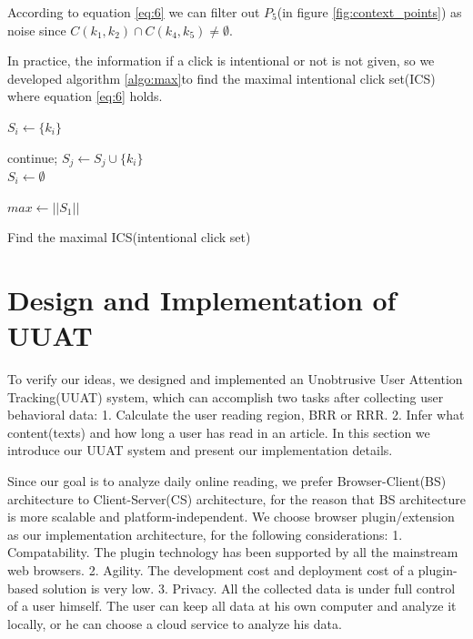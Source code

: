 \documentclass{sigchi}
\begin{document}
According to equation \ref{eq:6} we can filter out $P_5$(in figure \ref{fig:context_points}) as noise since 
$C({k_1},{k_2}) \cap C({k_4},{k_5}) \ne \emptyset $. 

In practice, the information if a click is intentional or not is not given, so we developed algorithm \ref{algo:max}to find the maximal 
intentional click set(ICS) where equation \ref{eq:6} holds.

\begin{algorithm}
\DontPrintSemicolon %


 {
    $S_i \gets  \{k_i\}   $\;
}

 {
	 {
		continue;
	}
	 {
    		 {
			${S_j} \gets {S_j} \cup \{ {k_i}\} $
\\
			${S_i} \gets \emptyset$
		}
	}
}

$max \gets ||S_1||$\;

 {
}

\;
\caption{Find the maximal ICS(intentional click set)}
\label{algo:max}
\end{algorithm}



\section{Design and Implementation of UUAT}
To verify our ideas, we designed and implemented an Unobtrusive User Attention Tracking(UUAT) 
system, which can accomplish two tasks after collecting user behavioral data: 1.  Calculate the user reading region, 
BRR or RRR. 2. Infer what content(texts) and how long a user has read in an article. 
In this section we introduce our UUAT system and present our implementation details.

Since our goal is to analyze daily online reading, we prefer 
Browser-Client(BS) architecture to Client-Server(CS) architecture, for the reason that
BS architecture is more scalable and platform-independent. 
We choose browser plugin/extension as our implementation architecture, for the following considerations:
1. Compatability. The plugin technology has been supported by all the mainstream web browsers. 
2. Agility. The development cost and deployment cost of a plugin-based solution is very low. 
3. Privacy. All the collected data is under full control of a user himself. The user can keep all data at his own computer and analyze it locally, or he can choose a cloud service to analyze his data.
\end{document}
